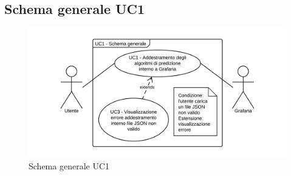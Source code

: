 \subsection{Schema generale UC1}
\begin{figure}[H]
\includegraphics{img/UC1_-_Schema_generale.png}
\caption{Schema generale UC1}
\end{figure}
